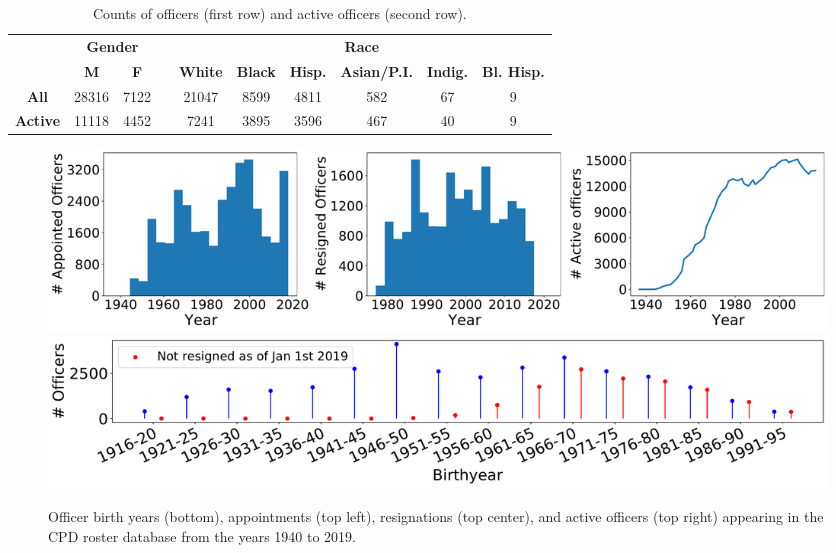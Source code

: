 \begin{table}[t!]
\caption{Counts of officers (first row) and active officers (second row).} \label{tab:stats}
\begin{tabular}{l|c|c|c|c|c|c|c|c|c|}
\cline{2-3} \cline{5-10}
                                               & \multicolumn{2}{c|}{\textbf{Gender}} & \multicolumn{1}{l|}{} & \multicolumn{6}{c|}{\textbf{Race}}                                                                                                                                                   \\ \cline{2-3} \cline{5-10} 
                                               & {\textbf{M}}   & {\textbf{F}}   &                       & {\textbf{White}} & {\textbf{Black}} & \multicolumn{1}{l|}{{\textbf{Hisp.}}} & {\textbf{Asian/P.I.}} & \multicolumn{1}{l|}{{\textbf{Indig.}}} & {\textbf{Bl. Hisp.}} \\ \cline{1-3} \cline{5-10} 
\multicolumn{1}{|c|}{\textbf{All}}    & 28316                 & 7122                  &                       & 21047                   & 8599                    & 4811                                         & 582                     & 67                                              & 9                           \\ \cline{1-3} \cline{5-10} 
\multicolumn{1}{|c|}{\textbf{Active}} & 11118                 & 4452                  &                       & 7241                    & 3895                    & 3596                                         & 467                     & 40                                              & 9                           \\ \cline{1-3} \cline{5-10} 
\end{tabular} 
\end{table}

\begin{figure}[ht!] 
\includegraphics[width=\textwidth]{figs/history} 
\includegraphics[width=\textwidth]{figs/history_by} 
\caption{Officer birth years (bottom), appointments (top left), resignations (top center), and active
officers (top right) appearing in the CPD roster database from the years 1940 to 2019.}
\label{fig:history}
\end{figure}


